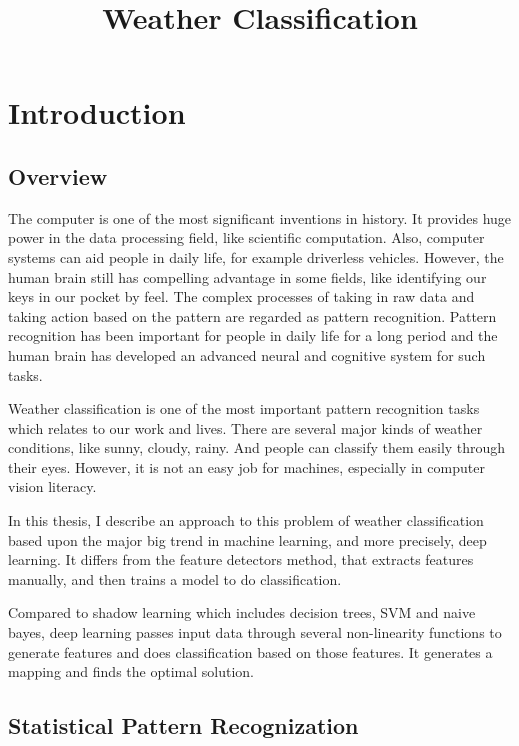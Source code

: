 \title  {Weather Classification}
\chapter{Introduction} %
\label{Chapter1}


\section{Overview}

The computer is one of the most significant inventions in history. It provides huge power in the data processing field, like scientific computation. Also, computer systems can aid people in daily life, for example driverless vehicles. However, the human brain still has compelling advantage in some fields, like identifying our keys in our pocket by feel. The complex processes of taking in raw data and taking action based on the pattern are regarded as pattern recognition. Pattern recognition has been important for people in daily life for a long period and the human brain has developed an advanced neural and cognitive system for such tasks.

Weather classification is one of the most important pattern recognition tasks which relates to our work and lives. There are several major kinds of weather conditions, like sunny, cloudy, rainy. And people can classify them easily through their eyes. However, it is not an easy job for machines, especially in computer vision literacy. 

In this thesis, I describe an approach to this problem of weather classification based upon the major big trend in machine learning, and more precisely, deep learning. It differs from the feature detectors method, that extracts features manually, and then trains a model to do classification.  

Compared to shadow learning which includes decision trees, SVM and naive bayes, deep learning passes input data through several non-linearity functions to generate features and does classification based on those features. It generates a mapping and finds the optimal solution.

\section{Statistical Pattern Recognization}

